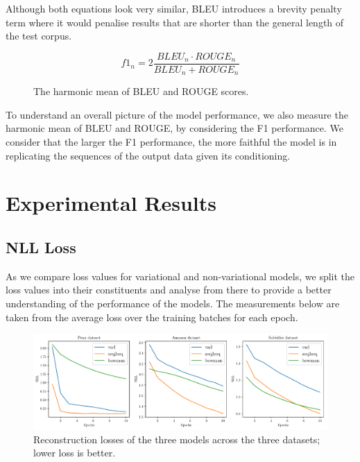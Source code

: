 \documentclass[12pt,twoside]{report}
\begin{document}
Although both equations look very similar, BLEU introduces a brevity penalty term where it would penalise results that are shorter than the general length of the test corpus.

\begin{figure}[!ht]
	\begin{equation}
		f1_{n} = 2 \frac{BLEU_n \cdot ROUGE_n}{BLEU_n + ROUGE_n}
	\end{equation}
	\caption{The harmonic mean of BLEU and ROUGE scores.}
\end{figure}

To understand an overall picture of the model performance, we also measure the harmonic mean of BLEU and ROUGE, by considering the F1 performance. We consider that the larger the F1 performance, the more faithful the model is in replicating the sequences of the output data given its conditioning.

\chapter{Experimental Results}


\section{NLL Loss}

As we compare loss values for variational and non-variational models, we split the loss values into their constituents and analyse from there to provide a better understanding of the performance of the models. The measurements below are taken from the average loss over the training batches for each epoch.

\begin{figure}[!ht]
	\centering
	\includegraphics[width=150mm]{results/nll.pdf}
	\caption{Reconstruction losses of the three models across the three datasets; lower loss is better. \label{r:nll}}
  \end{figure}
\end{document}
